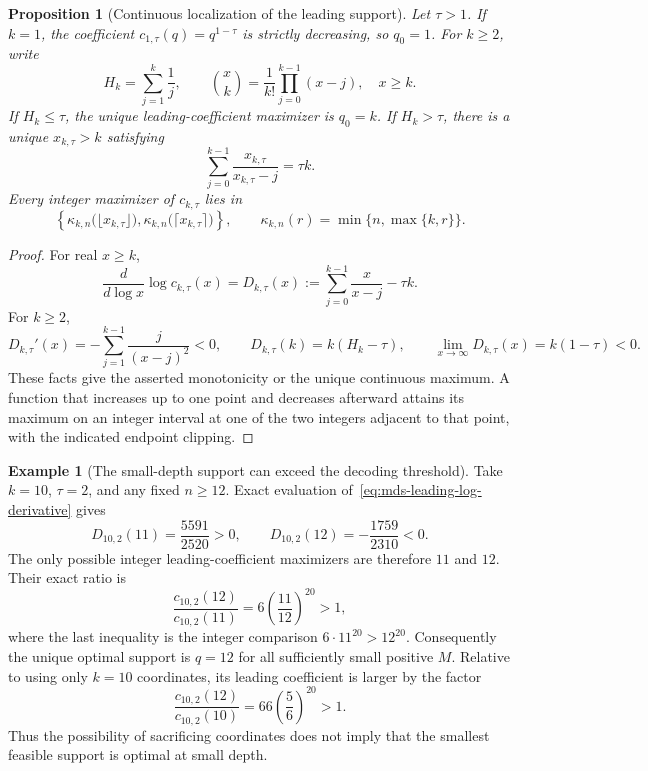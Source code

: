 \documentclass[11pt]{article}
\newtheorem{proposition}{Proposition}
\theoremstyle{definition}
\newtheorem{example}{Example}
\theoremstyle{remark}
\newcommand{\1}{\mathbf 1}
\begin{document}
\begin{proposition}[Continuous localization of the leading support]
\label{prop:mds-leading-localization}
Let \(\tau>1\).  If \(k=1\), the coefficient
\(c_{1,\tau}(q)=q^{1-\tau}\) is strictly decreasing, so \(q_0=1\).
For \(k\ge2\), write
\[
  H_k=\sum_{j=1}^k\frac1j,
  \qquad
  \binom{x}{k}=\frac1{k!}\prod_{j=0}^{k-1}(x-j),\quad x\ge k.
\]
If \(H_k\le\tau\), the unique leading-coefficient maximizer is
\(q_0=k\).  If \(H_k>\tau\), there is a unique \(x_{k,\tau}>k\)
satisfying
\begin{equation}\label{eq:mds-leading-critical}
  \sum_{j=0}^{k-1}\frac{x_{k,\tau}}{x_{k,\tau}-j}=\tau k.
\end{equation}
Every integer maximizer of \(c_{k,\tau}\) lies in
\begin{equation}\label{eq:mds-leading-neighbors}
  \left\{
    \kappa_{k,n}\bigl(\lfloor x_{k,\tau}\rfloor\bigr),
    \kappa_{k,n}\bigl(\lceil x_{k,\tau}\rceil\bigr)
  \right\},
  \qquad
  \kappa_{k,n}(r)=\min\{n,\max\{k,r\}\}.
\end{equation}
\end{proposition}

\begin{proof}
For real \(x\ge k\),
\begin{equation}\label{eq:mds-leading-log-derivative}
  \frac{d}{d\log x}\log c_{k,\tau}(x)
  =D_{k,\tau}(x)
  :=\sum_{j=0}^{k-1}\frac{x}{x-j}-\tau k.
\end{equation}
For \(k\ge2\),
\[
  D_{k,\tau}'(x)
  =-\sum_{j=1}^{k-1}\frac{j}{(x-j)^2}<0,
  \qquad
  D_{k,\tau}(k)=k(H_k-\tau),
  \qquad
  \lim_{x\to\infty}D_{k,\tau}(x)=k(1-\tau)<0.
\]
These facts give the asserted monotonicity or the unique continuous
maximum.  A function that increases up to one point and decreases
afterward attains its maximum on an integer interval at one of the two
integers adjacent to that point, with the indicated endpoint clipping.
\end{proof}

\begin{example}[The small-depth support can exceed the decoding threshold]
\label{ex:mds-small-depth-twelve}
Take \(k=10\), \(\tau=2\), and any fixed \(n\ge12\).  Exact evaluation
of~\eqref{eq:mds-leading-log-derivative} gives
\[
  D_{10,2}(11)=\frac{5591}{2520}>0,
  \qquad
  D_{10,2}(12)=-\frac{1759}{2310}<0.
\]
The only possible integer leading-coefficient maximizers are therefore
\(11\) and \(12\).  Their exact ratio is
\[
  \frac{c_{10,2}(12)}{c_{10,2}(11)}
  =6\left(\frac{11}{12}\right)^{20}>1,
\]
where the last inequality is the integer comparison
\(6\cdot11^{20}>12^{20}\).  Consequently the unique optimal support
is \(q=12\) for all sufficiently small positive \(M\).  Relative to
using only \(k=10\) coordinates, its leading coefficient is larger by
the factor
\[
  \frac{c_{10,2}(12)}{c_{10,2}(10)}
  =66\left(\frac56\right)^{20}>1.
\]
Thus the possibility of sacrificing coordinates does not imply that
the smallest feasible support is optimal at small depth.
\end{example}
\end{document}
